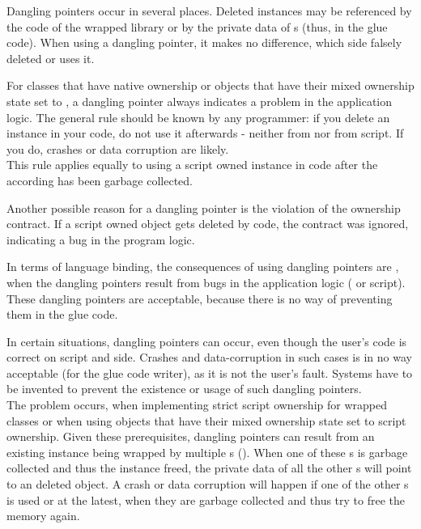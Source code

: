 Dangling pointers occur in several places. Deleted instances may be referenced by the  code of the wrapped library or by the private data of s (thus, in the glue code). When using a dangling pointer, it makes no difference, which side falsely deleted or uses it.

For classes that have native ownership or objects that have their mixed ownership state set to , a dangling pointer always indicates a problem in the application logic. The general rule should be known by any  programmer: if you delete an instance in your  code, do not use it afterwards - neither from  nor from script. If you do, crashes or data corruption are likely.\\
This rule applies equally to using a script owned instance in  code after the according  has been garbage collected.

Another possible reason for a dangling pointer is the violation of the ownership contract. If a script owned object gets deleted by  code, the contract was ignored, indicating a bug in the program logic.

In terms of language binding, the consequences of using dangling pointers are , when the dangling pointers result from bugs in the application logic ( or script). These dangling pointers are acceptable, because there is no way of preventing them in the glue code.

In certain situations, dangling pointers can occur, even though the user's code is correct on script and  side. Crashes and data-corruption in such cases is in no way acceptable (for the glue code writer), as it is not the user's fault. Systems have to be invented to prevent the existence or usage of such dangling pointers.\\
The problem occurs, when implementing strict script ownership for wrapped classes or when using objects that have their mixed ownership state set to script ownership. Given these prerequisites, dangling pointers can result from an existing  instance being wrapped by multiple s (). When one of these s is garbage collected and thus the  instance freed, the private data of all the other s will point to an deleted object. A crash or data corruption will happen if one of the other s is used or at the latest, when they are garbage collected and thus try to free the memory again.

